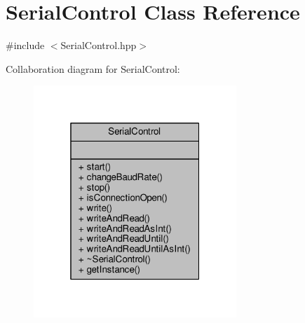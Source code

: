 \hypertarget{class_serial_control}{}\section{Serial\+Control Class Reference}
\label{class_serial_control}


{\ttfamily \#include $<$Serial\+Control.\+hpp$>$}



Collaboration diagram for Serial\+Control\+:
\nopagebreak
\begin{figure}[H]
\begin{center}
\leavevmode
\includegraphics[width=217pt]{class_serial_control__coll__graph}
\end{center}
\end{figure}
